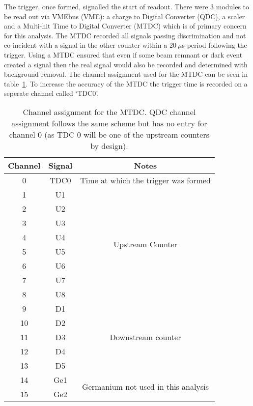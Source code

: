 \documentclass[]{article}
\newcommand{\ms}{$~\mu$s}
\begin{document}
The trigger, once formed, signalled the start of readout. There were 3 modules to be read out via VMEbus (VME): a charge to Digital Converter (QDC), a scaler and a Multi-hit Time to Digital Converter (MTDC) which is of primary concern for this analysis. The MTDC recorded all signals passing discrimination and not co-incident with a signal in the other counter within a 20\ms{} period following the trigger. Using a MTDC ensured that even if some beam remnant or dark event created a signal then the real signal would also be recorded and determined with background removal. The channel assignment used for the MTDC can be seen in table~\ref{tab:mtdc_ch}. To increase the accuracy of the MTDC the trigger time is recorded on a seperate channel called `TDC0'.
\begin{table}
	\begin{center}
	\begin{tabular}{c|c|c}
		Channel & Signal & Notes\\
		\hline
		0  & TDC0 & Time at which the trigger was formed \\
		\hline
		1  & U1   & \multirow{8}{*}{Upstream Counter}\\
		2  & U2   & \\
		3  & U3   & \\
		4  & U4   & \\
		5  & U5   & \\
		6  & U6   & \\
		7  & U7   & \\
		8  & U8   & \\
		\hline
		9  & D1   & \multirow{5}{*}{Downstream counter}\\
		10 & D2   & \\
		11 & D3   & \\
		12 & D4   & \\
		13 & D5   & \\
		\hline
		14 & Ge1  & \multirow{2}{*}{Germanium not used in this analysis}\\
		15 & Ge2  & \\
	\end{tabular}
	\end{center}
	\caption{Channel assignment for the MTDC. QDC channel assignment follows the same scheme but has no entry for channel 0 (as TDC 0 will be one of the upstream counters by design).}
	\label{tab:mtdc_ch}
\end{table}
\end{document}
